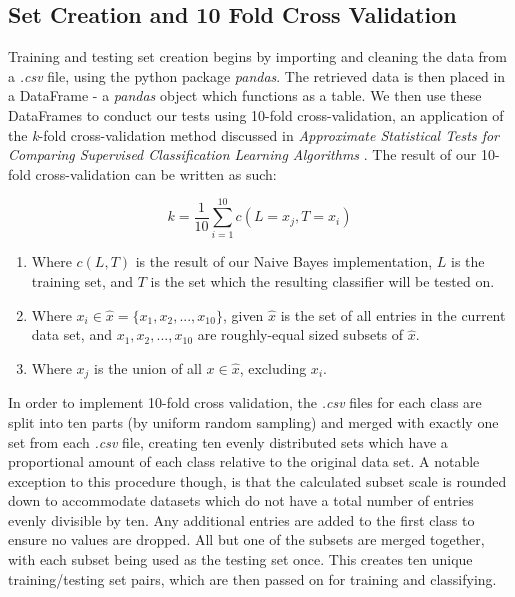 \documentclass[twoside,11pt]{article}
\begin{document}
	\subsection{Set Creation and 10 Fold Cross Validation}\label{subsec:10-fold-cv}
	Training and testing set creation begins by importing and cleaning the data from a \textit{.csv} file, using the python package \textit{pandas}. The retrieved data is then placed in a DataFrame - a \textit{pandas} object which functions as a table. We then use these DataFrames to conduct our tests using 10-fold cross-validation, an application of the \textit{k}-fold cross-validation method discussed in \textit{Approximate Statistical Tests for Comparing Supervised Classification Learning Algorithms} \citep{Dietterich1997}. The result of our 10-fold cross-validation can be written as such:
	
	\begin{equation}
		k = \frac{1}{10}\sum_{i=1}^{10}c(L = x_j, T = x_i)
	\end{equation}
	
	\begin{enumerate}
		\item Where $c(L,T)$ is the result of our Naive Bayes implementation, $L$ is the training set, and $T$ is the set which the resulting classifier will be tested on.
		\item Where $x_i \in \hat{x} = \{x_1, x_2, ..., x_{10}\}$, given $\hat{x}$ is the set of all entries in the current data set, and $x_1, x_2, ..., x_{10}$ are roughly-equal sized subsets of $\hat{x}$.
		\item Where $x_j$ is the union of all $x \in \hat{x}$, excluding $x_i$.
	\end{enumerate}
	
	In order to implement 10-fold cross validation, the \textit{.csv} files for each class are split into ten parts (by uniform random sampling) and merged with exactly one set from each \textit{.csv} file, creating ten evenly distributed sets which have a proportional amount of each class relative to the original data set. A notable exception to this procedure though, is that the calculated subset scale is rounded down to accommodate datasets which do not have a total number of entries evenly divisible by ten. Any additional entries are added to the first class to ensure no values are dropped. All but one of the subsets are merged together, with each subset being used as the testing set once. This creates ten unique training/testing set pairs, which are then passed on for training and classifying.
	 	
\end{document}
